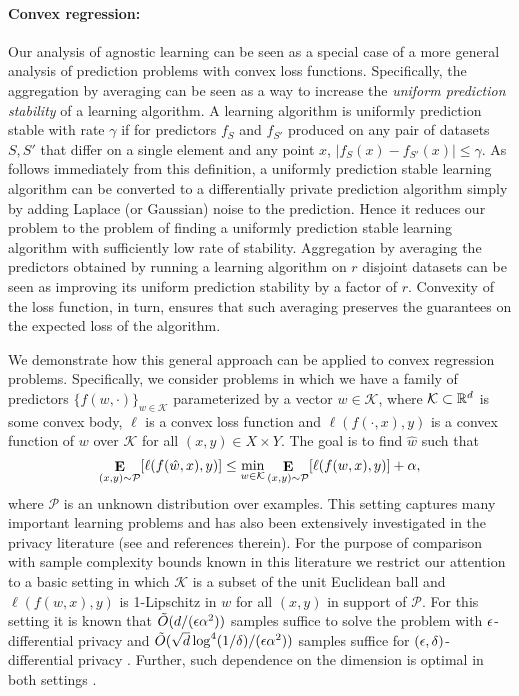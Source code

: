 \documentclass[final,12pt]{colt2018}
\providecommand{\K}{{\mathcal K}}
\providecommand{\cP}{{\mathcal P}}
\begin{document}
\paragraph{Convex regression:}
Our analysis of agnostic learning can be seen as a special case of a more general analysis of prediction problems with convex loss functions. Specifically, the aggregation by averaging can be seen as a way to increase the {\em uniform prediction stability} of a learning algorithm. A learning algorithm is uniformly prediction stable with rate $\gamma$ if for predictors $f_S$ and $f_{S'}$ produced on any pair of datasets $S,S'$ that differ on a single element and any point $x$, $|f_S(x) - f_{S'}(x)| \leq \gamma$. As follows immediately from this definition, a uniformly prediction stable learning algorithm can be converted to a differentially private prediction algorithm simply by adding Laplace (or Gaussian) noise to the prediction. Hence it reduces our problem to the problem of finding a uniformly prediction stable learning algorithm with sufficiently low rate of stability. Aggregation by averaging the predictors obtained by running a learning algorithm on $r$ disjoint datasets can be seen as improving its uniform prediction stability by a factor of $r$. Convexity of the loss function, in turn, ensures that such averaging preserves the guarantees on the expected loss of the algorithm.

We demonstrate how this general approach can be applied to convex regression problems.  Specifically, we consider problems in which we have a family of predictors $\{ f(w,\cdot)\}_{w\in \K}$ parameterized by a vector $w \in \K $, where $\K \subset \R^d$ is some convex body, $\ell$ is a convex loss function and $\ell(f(\cdot,x),y)$ is a convex function of $w$ over $\K$ for all $(x,y) \in X\times Y$. The goal is to find $\hat{w}$ such that $$\E_{(x,y)\sim\cP}[\ell(f(\hat{w},x),y)] \leq \min_{w \in \K} \E_{(x,y)\sim\cP}[\ell(f(w,x),y)]+\alpha,$$  where $\cP$ is an unknown distribution over examples. This setting captures many important learning problems and has also been extensively investigated in the privacy literature (see \citep{ChaudhuriMS11,KiferST12,BassilyST14,TalwarTZ15,WangYX17} and references therein). For the purpose of comparison with sample complexity bounds known in this literature we restrict our attention to a basic setting in which $\K$ is a subset of the unit Euclidean ball and $\ell(f(w,x),y)$ is 1-Lipschitz in $w$ for all $(x,y)$ in support of $\cP$. For this setting it is known that $\tilde{O}(d/(\epsilon \alpha^2))$ samples suffice to solve the problem with $\epsilon$-differential privacy and $\tilde{O}(\sqrt{d}\log^4(1/\delta)/(\epsilon \alpha^2))$ samples suffice for $(\epsilon,\delta)$-differential privacy \citep{BassilyST14}. Further, such dependence on the dimension is optimal in both settings \citep{BassilyST14}.
\end{document}
